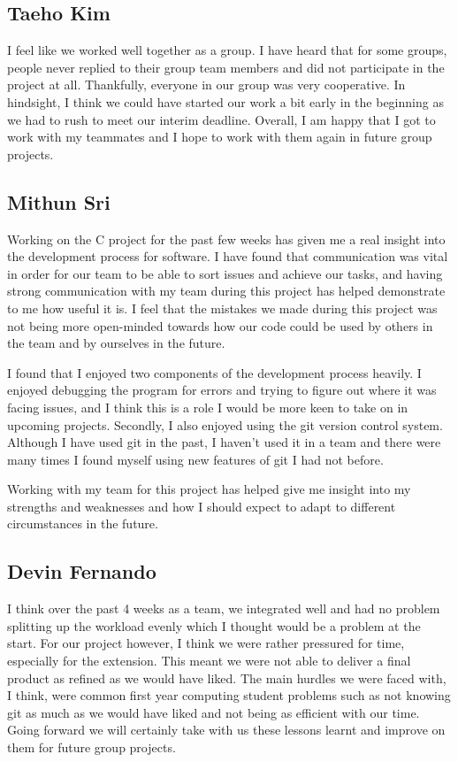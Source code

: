 \documentclass[11pt]{article}
\begin{document}
\subsection*{Taeho Kim}
\-\hspace{0.6cm}I feel like we worked well together as a group. I have heard that for some groups, people never replied to their group team members and did not participate in the project at all. Thankfully, everyone in our group was very cooperative. In hindsight, I think we could have started our work a bit early in the beginning as we had to rush to meet our interim deadline. Overall, I am happy that I got to work with my teammates and I hope to work with them again in future group projects. 

\subsection*{Mithun Sri}
\-\hspace{0.6cm}Working on the C project for the past few weeks has given me a real insight into the development process for software. I have found that communication was vital in order for our team to be able to sort issues and achieve our tasks, and having strong communication with my team during this project has helped demonstrate to me how useful it is. I feel that the mistakes we made during this  project was not being more open-minded towards how our code could be used by others in the team and by ourselves in the future. 

I found that I enjoyed two components of the development process heavily. I enjoyed debugging the program for errors and trying to figure out where it was facing issues, and I think this is a role I would be more keen to take on in upcoming projects. Secondly, I also enjoyed using the git version control system. Although I have used git in the past, I haven’t used it in a team and there were many times I found myself using new features of git I had not before.

Working with my team for this project has helped give me insight into my strengths and weaknesses and how I should expect to adapt to different circumstances in the future.

\subsection*{Devin Fernando}
\-\hspace{0.6cm}I think over the past 4 weeks as a team, we integrated well and had no problem splitting up the workload evenly which I thought would be a problem at the start. For our project however, I think we were rather pressured for time, especially for the extension. This meant we were not able to deliver a final product as refined as we would have liked. The main hurdles we were faced with, I think, were common first year computing student problems such as not knowing git as much as we would have liked and not being as efficient with our time. Going forward we will certainly take with us these lessons learnt and improve on them for future group projects.
\end{document}
